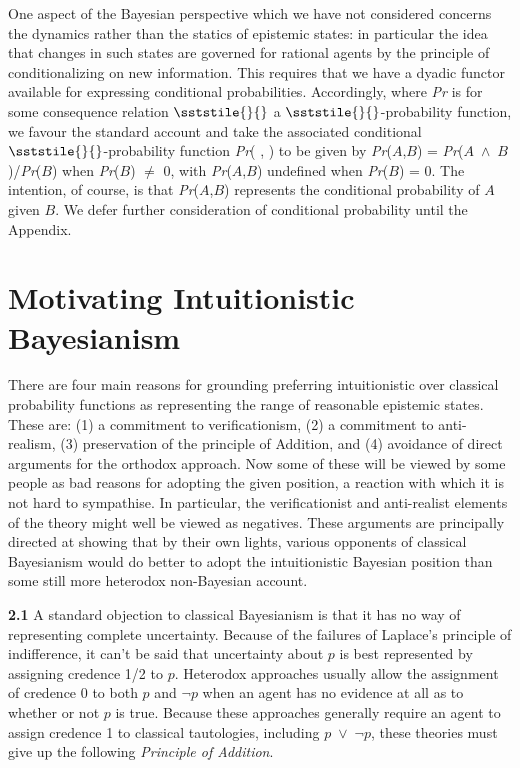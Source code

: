 One aspect of the Bayesian perspective which we have not considered concerns the dynamics rather than the statics of epistemic states: in particular the idea that changes in such states are governed for rational agents by the principle of conditionalizing on new information. This requires that we have a dyadic functor available for expressing conditional probabilities. Accordingly, where \textit{Pr} is for some consequence relation {\small \(\sststile{}{}\)} a {\small \(\sststile{}{}\)}{}-probability function, we favour the standard account and take the associated conditional {\small \(\sststile{}{}\)}{}-probability function \textit{Pr}( {\textperiodcentered} , {\textperiodcentered} ) to be given by \textit{Pr}(\(A\),\(B\)) = \textit{Pr}(\(A\)~${\wedge}$~\(B\))/\textit{Pr}(\(B\)) when \textit{Pr}(\(B\)) ${\neq}$ 0, with \textit{Pr}(\(A\),\(B\)) undefined when \textit{Pr}(\(B\)) = 0. The intention, of course, is that \textit{Pr}(\(A\),\(B\)) represents the conditional probability of \(A\) given \(B\). We defer further consideration of conditional probability until the Appendix.


\section{Motivating Intuitionistic Bayesianism}
There are four main reasons for grounding preferring intuitionistic over classical probability functions as representing the range of reasonable epistemic states. These are: (1) a commitment to verificationism, (2) a commitment to anti-realism, (3) preservation of the principle of Addition, and (4) avoidance of direct arguments for the orthodox approach. Now some of these will be viewed by some people as bad reasons for adopting the given position, a reaction with which it is not hard to sympathise. In particular, the verificationist and anti-realist elements of the theory might well be viewed as negatives. These arguments are principally directed at showing that by their own lights, various opponents of classical Bayesianism would do better to adopt the intuitionistic Bayesian position than some still more heterodox non-Bayesian account.


\textbf{2.1 }A standard objection to classical Bayesianism is that it has no way of representing complete uncertainty. Because of the failures of Laplace's principle of indifference, it can't be said that uncertainty about \(p\) is best represented by assigning credence 1/2 to \(p\). Heterodox approaches usually allow the assignment of credence 0 to both \(p\) and ${\lnot}$\(p\) when an agent has no evidence at all as to whether or not \(p\) is true. Because these approaches generally require an agent to assign credence 1 to classical tautologies, including \(p\)~${\vee}$~${\lnot}$\(p\), these theories must give up the following \textit{Principle of Addition}.

